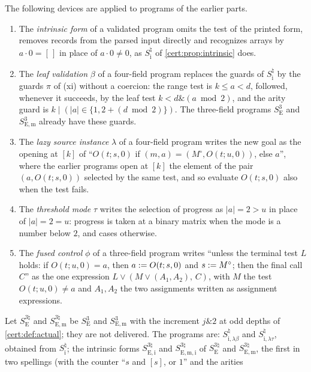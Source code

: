 The following devices are applied to programs of the earlier parts.
\begin{enumerate}[label=(\roman*),start=13]
\item The \emph{intrinsic form} of a validated program omits the test of the printed form,
removes records from the parsed input directly and recognizes arrays by $a\cdot 0=[\,]$ in
place of $a\cdot 0\neq 0$, as $S^{\natural}_{\mathrm i}$ of \cref{cert:prop:intrinsic} does.
\item The \emph{leaf validation} $\beta$ of a four-field program replaces the guards of
$S^{\natural}_{\mathrm i}$ by the guards $\pi$ of (xi) without a coercion: the range test is
$k\le a<d$, followed, whenever it succeeds, by the leaf test $k<d\mathbin{\&}(a\bmod 2)$, and
the arity guard is $k\mathbin{|}(\lvert a\rvert\in\{1,2+(d\bmod 2)\})$. The three-field
programs $S^{3}_{\mathrm E}$ and $S^{3}_{\mathrm{E,m}}$ already have these guards.
\item The \emph{lazy source instance} $\lambda$ of a four-field program writes the new goal
as the opening at $[k]$ of ``$O(t;s,0)$ if $(m,a)=(M^{\circ},O(t;u,0))$, else $a$'', where
the earlier programs open at $[k]$ the element of the pair $(a,O(t;s,0))$ selected by the
same test, and so evaluate $O(t;s,0)$ also when the test fails.
\item The \emph{threshold mode} $\tau$ writes the selection of progress as
$\lvert a\rvert=2>u$ in place of $\lvert a\rvert=2=u$: progress is taken at a binary matrix
when the mode is a number below $2$, and cases otherwise.
\item The \emph{fused control} $\phi$ of a three-field program writes ``unless the
terminal test $L$ holds: if $O(t;u,0)=a$, then $a\mathrel{:=} O(t;s,0)$ and $s\mathrel{:=} M^{\circ}$;
then the final call $C$'' as the one expression $L\lor(M\lor(A_1,A_2),\,C)$, with $M$ the
test $O(t;u,0)\neq a$ and $A_1,A_2$ the two assignments written as assignment expressions.
\end{enumerate}
Let $S^{3\natural}_{\mathrm E}$ and $S^{3\natural}_{\mathrm{E,m}}$ be $S^{3}_{\mathrm E}$ and
$S^{3}_{\mathrm{E,m}}$ with the increment $j\mathbin{\&}2$ at odd depths of
\cref{cert:def:actual}; they are not delivered. The programs are: $S^{\natural}_{\mathrm{i},
\lambda\beta}$ and $S^{\natural}_{\mathrm{i},\lambda\tau}$, obtained from
$S^{\natural}_{\mathrm i}$; the intrinsic forms $S^{3\natural}_{\mathrm{E,i}}$ and
$S^{3\natural}_{\mathrm{E,m,i}}$ of $S^{3\natural}_{\mathrm E}$ and $S^{3\natural}_{\mathrm{E,m}}$,
the first in two spellings (with the counter ``$s$ and $[s]$, or $1$'' and the arities
